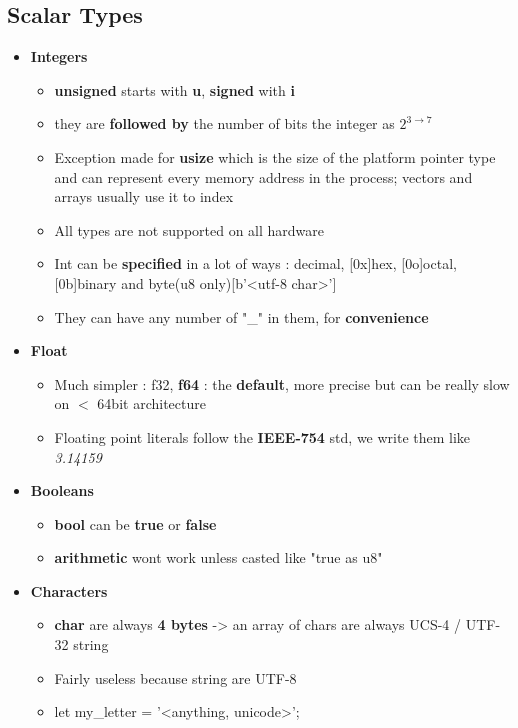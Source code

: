 \documentclass{report}
\begin{document}
\begin{multicols*}{2}

\section{Scalar Types}

\begin{itemize}
  \item \textbf{Integers}
    \begin{itemize}
      \item \textbf{unsigned} starts with \textbf{u}, \textbf{signed} with \textbf{i} 
      \item they are \textbf{followed by} the number of bits the integer as $2^{3 \rightarrow 7}$ 
      \item Exception made for \textbf{usize} which is the size of the platform pointer type and can represent
        every memory address in the process; vectors and arrays usually use it to index 
      \item All types are not supported on all hardware 
      \item Int can be \textbf{specified} in a lot of ways : decimal, [0x]hex, [0o]octal, [0b]binary and byte(u8 only)[b'<utf-8 char>']
      \item They can have any number of "\_" in them, for \textbf{convenience} 
    \end{itemize}
  \item \textbf{Float} 
    \begin{itemize}
      \item Much simpler : f32, \textbf{f64} : the \textbf{default}, more precise but can be really slow on $<$ 64bit architecture 
      \item Floating point literals follow the \textbf{IEEE-754} std, we write them like \textit{3.14159} 
    \end{itemize}
  \item \textbf{Booleans} 
    \begin{itemize}
      \item \textbf{bool} can be \textbf{true} or \textbf{false} 
      \item \textbf{arithmetic} wont work unless casted like "true as u8"
    \end{itemize}
  \item \textbf{Characters}
    \begin{itemize}
      \item \textbf{char} are always \textbf{4 bytes} -> an array of chars are always UCS-4 / UTF-32 string 
      \item Fairly useless because string are UTF-8 
      \item let my\_letter = '<anything, unicode>';
    \end{itemize}
\end{itemize}


\end{multicols*}
\end{document}
